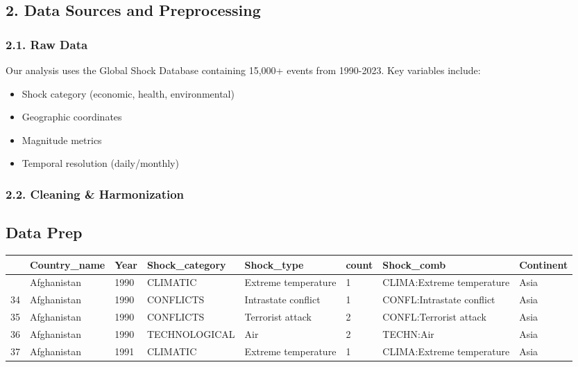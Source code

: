 \documentclass[
]{article}
\begin{document}
\subsection{2. Data Sources and
Preprocessing}\label{data-sources-and-preprocessing}

\subsubsection{2.1. Raw Data}\label{raw-data}

Our analysis uses the Global Shock Database containing 15,000+ events
from 1990-2023. Key variables include:

\begin{itemize}
\item
  Shock category (economic, health, environmental)
\item
  Geographic coordinates
\item
  Magnitude metrics
\item
  Temporal resolution (daily/monthly)
\end{itemize}

\subsubsection{2.2. Cleaning \&
Harmonization}\label{cleaning-harmonization}

\subsection{Data Prep}\label{data-prep}

\begin{longtable}[]{@{}llllllll@{}}
\toprule\noalign{}
& Country\_name & Year & Shock\_category & Shock\_type & count &
Shock\_comb & Continent \\
\midrule\noalign{}
\endhead
\bottomrule\noalign{}
\endlastfoot
33 & Afghanistan & 1990 & CLIMATIC & Extreme temperature & 1 &
CLIMA:Extreme temperature & Asia \\
34 & Afghanistan & 1990 & CONFLICTS & Intrastate conflict & 1 &
CONFL:Intrastate conflict & Asia \\
35 & Afghanistan & 1990 & CONFLICTS & Terrorist attack & 2 &
CONFL:Terrorist attack & Asia \\
36 & Afghanistan & 1990 & TECHNOLOGICAL & Air & 2 & TECHN:Air & Asia \\
37 & Afghanistan & 1991 & CLIMATIC & Extreme temperature & 1 &
CLIMA:Extreme temperature & Asia \\
\end{longtable}
\end{document}
